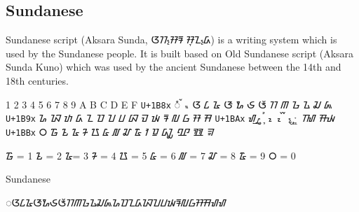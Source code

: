 \subsection{Sundanese}
\newfontfamily{}
\newfontfamily{}
\def\ublock#1{\texttt{{\arial #1}}}

Sundanese script (Aksara Sunda, {\sundanese ᮃᮊ᮪ᮞᮛ ᮞᮥᮔ᮪ᮓ}) is a writing system which is used by the Sundanese people. It is built based on Old Sundanese script (Aksara Sunda Kuno) which was used by the ancient Sundanese between the 14th and 18th centuries.


\sundanese
\obeylines

{	1	2	3	4	5	6	7	8	9	A	B	C	D	E	F}
\ublock{U+1B8x}	ᮀ	ᮁ	ᮂ	ᮃ	ᮄ	ᮅ	ᮆ	ᮇ	ᮈ	ᮉ	ᮊ	ᮋ	ᮌ	ᮍ	ᮎ	ᮏ
\ublock{U+1B9x}	ᮐ	ᮑ	ᮒ	ᮓ	ᮔ	ᮕ	ᮖ	ᮗ	ᮘ	ᮙ	ᮚ	ᮛ	ᮜ	ᮝ	ᮞ	ᮟ
\ublock{U+1BAx}	ᮠ	ᮡ	ᮢ	ᮣ	ᮤ	ᮥ	ᮦ	ᮧ	ᮨ	ᮩ	᮪	 ᮫ 	ᮬ	ᮭ	ᮮ	ᮯ
\ublock{U+1BBx}	᮰	᮱	᮲	᮳	᮴	᮵	᮶	᮷	᮸	᮹	ᮺ	ᮻ	ᮼ	ᮽ	ᮾ	ᮿ

᮱ {\arial= 1}	᮲ {\arial= 2}	᮳{\arial = 3}
᮴ {\arial= 4}	᮵ {\arial = 5} 	᮶ {\arial= 6}
᮷ {\arial= 7}	᮸ {\arial= 8}	᮹ {\arial= 9}
᮰ {\arial= 0}

\begin{scriptexample}[]{Sundanese}
\bgroup
\sundanese
\centering

◌ᮃᮄᮅᮆᮇᮈᮉᮊᮋᮌᮍᮎᮏᮐᮕᮔᮓᮑᮖᮗᮚᮛᮜᮝᮞᮟᮠᮠ
\egroup
\end{scriptexample}